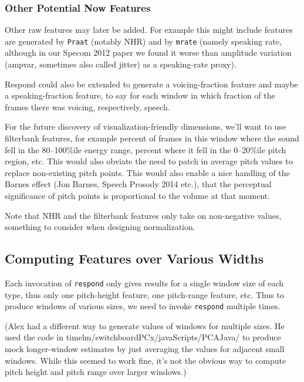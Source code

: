 \documentclass[11pt]{article}
\begin{document}
\subsubsection{Other Potential Now Features}   \label{other-features}

Other raw features may later be added.  For example this might include
features are generated by {\tt Praat} (notably NHR) and by {\tt mrate}
(namely speaking rate, although in our Specom 2012 paper we found it
worse than amplitude variation (ampvar, sometimes also called jitter)
as a speaking-rate proxy).

Respond could also be extended to generate a voicing-fraction feature
and maybe a speaking-fraction feature, to say for each window in which
fraction of the frames there was voicing, respectively, speech.

For the future discovery of visualization-friendly dimensions, we'll
want to use filterbank features, for example percent of frames in this
window where the sound fell in the 80--100\%ile energy range, percent
where it fell in the 0--20\%ile pitch region, etc. This would also
obviate the need to  patch in average pitch values to replace non-existing pitch
points.  This would also enable a nice handling of the Barnes effect
(Jon Barnes, Speech Prosody 2014 etc.), that the perceptual
significance of pitch points is proportional to the volume at that
moment.

Note that NHR and the filterbank features only take on non-negative
values, something to consider when designing normalization.


\subsection{Computing Features over Various Widths}  \label{multirespond}

Each invocation of {\tt respond} only gives results for a single
window size of each type, thus only one pitch-height feature, one
pitch-range feature, etc.  Thus to produce windows of various sizes,
we need to invoke {\tt respond} multiple times.

(Alex had a different way to generate values of windows for multiple
sizes.  He used the code in timelm/switchboardPCx/javaScripts/PCAJava/
to produce mock longer-window estimates by just averaging the values
for adjacent small windows.  While this seemed to work fine, it's not
the obvious way to compute pitch height and pitch range over larger
windows.)
\end{document}
